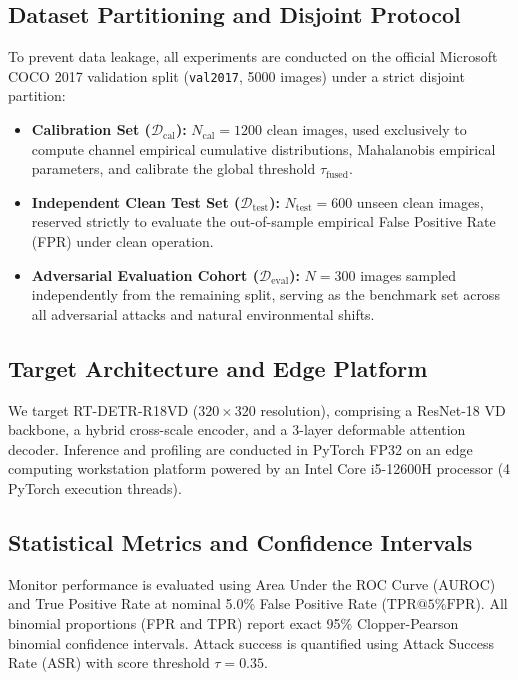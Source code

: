 \documentclass[preprint,12pt]{elsarticle}
\begin{document}
\subsection{Dataset Partitioning and Disjoint Protocol}
To prevent data leakage, all experiments are conducted on the official Microsoft COCO 2017 validation split (\texttt{val2017}, 5000 images) \citep{lin2014microsoft} under a strict disjoint partition:
\begin{itemize}
    \item \textbf{Calibration Set ($\mathcal{D}_{\mathrm{cal}}$):} $N_{\mathrm{cal}} = 1200$ clean images, used exclusively to compute channel empirical cumulative distributions, Mahalanobis empirical parameters, and calibrate the global threshold $\tau_{\mathrm{fused}}$.
    \item \textbf{Independent Clean Test Set ($\mathcal{D}_{\mathrm{test}}$):} $N_{\mathrm{test}} = 600$ unseen clean images, reserved strictly to evaluate the out-of-sample empirical False Positive Rate (FPR) under clean operation.
    \item \textbf{Adversarial Evaluation Cohort ($\mathcal{D}_{\mathrm{eval}}$):} $N=300$ images sampled independently from the remaining split, serving as the benchmark set across all adversarial attacks and natural environmental shifts.
\end{itemize}

\subsection{Target Architecture and Edge Platform}
We target RT-DETR-R18VD ($320 \times 320$ resolution), comprising a ResNet-18 VD backbone, a hybrid cross-scale encoder, and a 3-layer deformable attention decoder. Inference and profiling are conducted in PyTorch FP32 on an edge computing workstation platform powered by an Intel Core i5-12600H processor (4 PyTorch execution threads).

\subsection{Statistical Metrics and Confidence Intervals}
Monitor performance is evaluated using Area Under the ROC Curve (AUROC) and True Positive Rate at nominal 5.0\% False Positive Rate ($\mathrm{TPR@5\%FPR}$). All binomial proportions (FPR and TPR) report exact 95\% Clopper-Pearson binomial confidence intervals. Attack success is quantified using Attack Success Rate (ASR) with score threshold $\tau = 0.35$.
\end{document}
